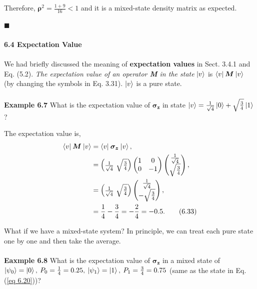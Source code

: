 \documentclass{article}
\begin{document}
Therefore, $\boldsymbol{\rho}^2=\frac{1+9}{16}< 1$ and it is a mixed-state density
matrix as expected.

\hfill $\blacksquare$\\\\
\textbf{\large 6.4 Expectation Value}\\\\
We had briefly discussed the meaning of \textbf{expectation values} in Sect. 3.4.1 and
Eq. (5.2). \textit{The expectation value of an operator \textbf{M} in the state} $\ket{v}$ is $\braket{v|\: \boldsymbol{M} \:|v}$
(by changing the symbols in Eq. 3.31). $\ket{v}$ is a pure state. \\\\
\textbf{Example 6.7} What is the expectation value of $\boldsymbol{\sigma_z}$ in state
$\ket{v}=\frac{1}{\sqrt{4}}\ket{0}+\sqrt{\frac{3}{4}}\ket{1}$?

The expectation value is,
\begin{align*} \label{eq 6.33}
    \braket{v| \: \boldsymbol{M} \:|v}&=\braket{v|\: \boldsymbol{\sigma_z} \:|v},\\
    &=\begin{pmatrix}
        \frac{1}{\sqrt{4}} \ \sqrt{\frac{3}{4}}
    \end{pmatrix}
    \begin{pmatrix}
        1 &0\\0 & -1
    \end{pmatrix}
    \begin{pmatrix}
         \frac{1}{\sqrt{4}} \\ \sqrt{\frac{3}{4}}
    \end{pmatrix},\\
    &=\begin{pmatrix}
        \frac{1}{\sqrt{4}} \ \sqrt{\frac{3}{4}}
    \end{pmatrix}
    \begin{pmatrix}
        \frac{1}{\sqrt{4}} \\ -\sqrt{\frac{3}{4}}
    \end{pmatrix},\\
    &=\frac{1}{4}-\frac{3}{4}=-\frac{2}{4}= -0.5.\tag{6.33}
\end{align*}

What if we have a mixed-state system? In principle, we can treat each pure state one by one and
then take the average.\\\\
\textbf{Eaxmple 6.8} What is the expectation value of $\boldsymbol{\sigma_z}$ in a mixed
state of $\ket{\psi_0}=\ket{0},\: P_0=\frac{1}{4}=0.25,\: \ket{\psi_1}=\ket{1}, \: P_1=\frac{3}{4}=0.75$ (same as the state in Eq. (\ref{eq 6.20}))?
\end{document}
